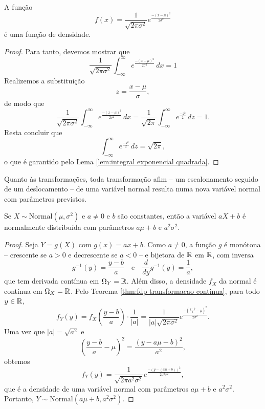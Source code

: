 \begin{prop:densidade da normal}
A função
\[
    f(x) = \frac{1}{\sqrt{2\pi\sigma^2}} e^{\frac{-(x - \mu)^2}{2\sigma^2}}
\]
é uma função de densidade.
\end{prop:densidade da normal}
\begin{proof}
Para tanto, devemos mostrar que
\[
    \frac{1}{\sqrt{2\pi\sigma^2}} \int_{-\infty}^{\infty}e^{\frac{-(x - \mu)^2}{2\sigma^2}}\,dx = 1
\]
Realizemos a substituição
\[
    z = \frac{x - \mu}{\sigma},
\]
de modo que
\[
    \frac{1}{\sqrt{2\pi\sigma^2}} \int_{-\infty}^{\infty}e^{\frac{-(x - \mu)^2}{2\sigma^2}}\,dx =
    \frac{1}{\sqrt{2\pi}} \int_{-\infty}^{\infty}e^{\frac{-z^2}{2}}\,dz = 1.
\]
Resta concluir que
\[
    \int_{-\infty}^{\infty}e^{\frac{-z^2}{2}}\,dz = \sqrt{2\pi},
\]
o que é garantido pelo Lema \ref{lem:integral exponencial quadrada}.
\end{proof}

Quanto às transformações, toda transformação afim -- um escalonamento seguido de um
deslocamento -- de uma variável normal resulta numa nova variável normal com parâmetros
previstos.

\begin{thm:tranformacao afim da normal}
Se $X \sim \mathrm{Normal}(\mu, \sigma^2)$ e $a \ne 0$ e $b$ são constantes, então
a variável $aX + b$ é normalmente distribuída com parâmetros $a\mu + b$ e $a^2\sigma^2$.
\end{thm:tranformacao afim da normal}
\begin{proof}
Seja $Y = g(X)$ com $g(x) = ax + b$.
Como $a \ne 0$, a função $g$ é monótona -- crescente se $a > 0$ e decrescente se $a < 0$ --
e bijetora de $\mathbb{R}$ em $\mathbb{R}$, com inversa
\[
    g^{-1}(y) = \frac{y - b}{a}
    \quad \text{e} \quad
    \frac{d}{dy} g^{-1}(y) = \frac{1}{a},
\]
que tem derivada contínua em $\Omega_Y = \mathbb{R}$.
Além disso, a densidade $f_X$ da normal é contínua em $\Omega_X = \mathbb{R}$.
Pelo Teorema \ref{thm:fdp transformacao continua}, para todo $y \in \mathbb{R}$,
\[
    f_Y(y) = f_X\left(\frac{y - b}{a}\right) \cdot \frac{1}{|a|} =
    \frac{1}{|a|\sqrt{2\pi\sigma^2}} e^{\frac{-\left(\frac{y - b}{a} - \mu\right)^2}{2\sigma^2}}.
\]
Uma vez que $|a| = \sqrt{a^2}$ e
\[
    \left(\frac{y - b}{a} - \mu\right)^2 = \frac{(y - a\mu - b)^2}{a^2},
\]
obtemos
\[
    f_Y(y) = \frac{1}{\sqrt{2\pi a^2\sigma^2}} e^{\frac{-(y - (a\mu + b))^2}{2a^2\sigma^2}},
\]
que é a densidade de uma variável normal com parâmetros $a\mu + b$ e $a^2\sigma^2$.
Portanto, $Y \sim \mathrm{Normal}(a\mu + b, a^2\sigma^2)$.
\end{proof}

